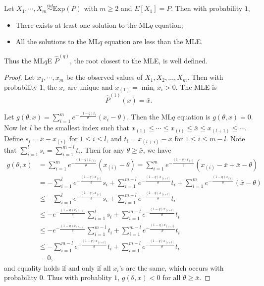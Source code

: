 \begin{lemma}
\label{lemma:LqlMLE}
Let $X_1, \cdots, X_m \stackrel{iid}{\sim} \mathrm{Exp}(P)$ with $m \ge 2$ and $E[X_1] = P$. Then with probability $1$,
\begin{itemize}
\item There exists at least one solution to the ML$q$ equation;
\item All the solutions to the ML$q$ equation are less than the MLE.
\end{itemize}
Thus the ML$q$E $\hat{P}^{(q)}$, the root closest to the MLE, is well defined.
\end{lemma}
\begin{proof}
Let $x_1, \cdots, x_m$ be the observed values of $X_1, X_2, \dots, X_m$. Then with probability $1$, the $x_i$ are unique and $x_{(1)} = \min_{i} x_i > 0$. The MLE is
\[
	\hat{P}^{(1)}(x) = \bar{x}.
\]

Let $g(\theta, x) = \sum_{i=1}^m e^{-\frac{(1-q)x_i}{\theta}}(x_i - \theta)$. Then the ML$q$ equation is $g(\theta, x) = 0$. Now let $l$ be the smallest index such that $x_{(1)} \le \cdots \le x_{(l)} \le \bar{x} \le x_{(l+1)} \le \cdots$. Define $s_i = \bar{x} - x_{(i)}$ for $1 \le i \le l$, and $t_{i} = x_{(l+i)} - \bar{x}$ for $1 \le i \le m - l$. Note that $\sum_{i=1}^l s_i = \sum_{i=1}^{m-l} t_i$. Then for any $\theta \ge \bar{x}$, we have
\begin{align*}
g(\theta, x) & = \sum_{i=1}^m e^{-\frac{(1-q)x_{(i)}}{\theta}}(x_{(i)} - \theta)
= \sum_{i=1}^m e^{-\frac{(1-q)x_{(i)}}{\theta}}(x_{(i)} - \bar{x} + \bar{x} - \theta) \\
& = - \sum_{i=1}^l e^{-\frac{(1-q)x_{(i)}}{\theta}}s_i
+ \sum_{i=1}^{m-l} e^{-\frac{(1-q)x_{(i+l)}}{\theta}}t_i
+ \sum_{i=1}^m e^{-\frac{(1-q)x_{(i)}}{\theta}}(\bar{x} - \theta)\\
& \le - \sum_{i=1}^l e^{-\frac{(1-q)x_{(i)}}{\theta}}s_i
+ \sum_{i=1}^{m-l} e^{-\frac{(1-q)x_{(i+l)}}{\theta}}t_i \\
& \le - e^{-\frac{(1-q)x_{(l+1)}}{\theta}} \sum_{i=1}^l s_i
+ \sum_{i=1}^{m-l} e^{-\frac{(1-q)x_{(i+l)}}{\theta}}t_i \\
& \le - e^{-\frac{(1-q)x_{(l+1)}}{\theta}} \sum_{i=1}^{m-l} t_i
+ \sum_{i=1}^{m-l} e^{-\frac{(1-q)x_{(i+l)}}{\theta}}t_i \\
& \le - \sum_{i=1}^{m-l} e^{-\frac{(1-q)x_{(i+l)}}{\theta}}t_i
+ \sum_{i=1}^{m-l} e^{-\frac{(1-q)x_{(i+l)}}{\theta}}t_i\\
& = 0,
\end{align*}
and equality holds if and only if all $x_i$'s are the same, which occurs with probability $0$. Thus with probablity $1$, $g(\theta, x) < 0$ for all $\theta \ge \bar{x}$.


\end{proof}
